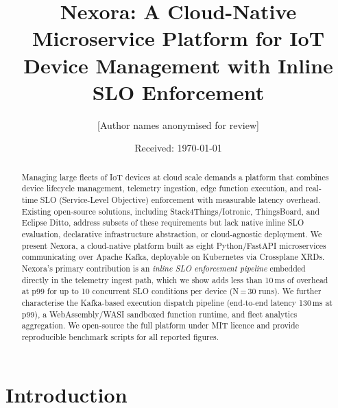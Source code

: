 \documentclass[twocolumn,smallextended]{svjour3}
\begin{document}
\title{Nexora: A Cloud-Native Microservice Platform for IoT Device Management with Inline SLO Enforcement}


\author{%
  [Author names anonymised for review]
}



\date{Received: \today}

\begin{abstract}
Managing large fleets of IoT devices at cloud scale demands a platform that combines
device lifecycle management, telemetry ingestion, edge function execution, and
real-time SLO (Service-Level Objective) enforcement with measurable latency
overhead. Existing open-source solutions, including Stack4Things/Iotronic,
ThingsBoard, and Eclipse Ditto, address subsets of these requirements but lack
native inline SLO evaluation, declarative infrastructure abstraction, or
cloud-agnostic deployment. We present Nexora, a cloud-native platform built as
eight Python/FastAPI microservices communicating over Apache Kafka, deployable
on Kubernetes via Crossplane XRDs. Nexora's primary contribution is an
\emph{inline SLO enforcement pipeline} embedded directly in the telemetry
ingest path, which we show adds less than 10\,ms of overhead at p99 for up to
10 concurrent SLO conditions per device (N\,=\,30 runs). We further characterise
the Kafka-based execution dispatch pipeline (end-to-end latency 130\,ms at p99),
a WebAssembly/WASI sandboxed function runtime, and fleet analytics aggregation.
We open-source the full platform under MIT licence and provide reproducible
benchmark scripts for all reported figures.

\end{abstract}

\maketitle

\section{Introduction}
\label{sec:intro}
\end{document}
